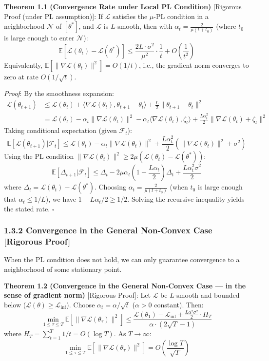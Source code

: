 \documentclass[
  12pt,
]{article}
\begin{document}
\textbf{Theorem 1.1 (Convergence Rate under Local PL Condition)} [Rigorous Proof (under PL assumption)]: If $\mathcal{L}$ satisfies the $\mu$-PL condition in a neighborhood $\mathcal{N}$ of $[\theta^*]$, and $\mathcal{L}$ is $L$-smooth, then with $\alpha_t = \frac{2}{\mu(t + t_0)}$ (where $t_0$ is large enough to enter $\mathcal{N}$):
\[\boxed{\mathbb{E}[\mathcal{L}(\theta_t) - \mathcal{L}(\theta^*)] \leq \frac{2L \cdot \sigma^2}{\mu^2} \cdot \frac{1}{t} + O\left(\frac{1}{t^2}\right)}\]
Equivalently, $\mathbb{E}[\|\nabla\mathcal{L}(\theta_t)\|^2] = O(1/t)$, i.e., the gradient norm converges to zero at rate $O(1/\sqrt{t})$.

\emph{Proof}: By the smoothness expansion:
\begin{align*}
\mathcal{L}(\theta_{t+1}) &\leq \mathcal{L}(\theta_t) + \langle\nabla\mathcal{L}(\theta_t), \theta_{t+1} - \theta_t\rangle + \frac{L}{2}\|\theta_{t+1} - \theta_t\|^2 \\
&= \mathcal{L}(\theta_t) - \alpha_t \|\nabla\mathcal{L}(\theta_t)\|^2 - \alpha_t \langle\nabla\mathcal{L}(\theta_t), \zeta_t\rangle + \frac{L\alpha_t^2}{2}\|\nabla\mathcal{L}(\theta_t) + \zeta_t\|^2
\end{align*}
Taking conditional expectation (given $\mathcal{F}_t$):
\[\mathbb{E}[\mathcal{L}(\theta_{t+1}) | \mathcal{F}_t] \leq \mathcal{L}(\theta_t) - \alpha_t \|\nabla\mathcal{L}(\theta_t)\|^2 + \frac{L\alpha_t^2}{2}(\|\nabla\mathcal{L}(\theta_t)\|^2 + \sigma^2)\]
Using the PL condition $\|\nabla\mathcal{L}(\theta_t)\|^2 \geq 2\mu(\mathcal{L}(\theta_t) - \mathcal{L}(\theta^*))$:
\[\mathbb{E}[\Delta_{t+1} | \mathcal{F}_t] \leq \Delta_t - 2\mu\alpha_t\left(1 - \frac{L\alpha_t}{2}\right)\Delta_t + \frac{L\alpha_t^2\sigma^2}{2}\]
where $\Delta_t = \mathcal{L}(\theta_t) - \mathcal{L}(\theta^*)$. Choosing $\alpha_t = \frac{2}{\mu(t+t_0)}$ (when $t_0$ is large enough that $\alpha_t \leq 1/L$), we have $1 - L\alpha_t/2 \geq 1/2$. Solving the recursive inequality yields the stated rate. $\square$

\subsubsection{1.3.2 Convergence in the General Non-Convex Case [Rigorous Proof]}\label{general-nonconvex-convergence}

When the PL condition does not hold, we can only guarantee convergence to a neighborhood of some stationary point.

\textbf{Theorem 1.2 (Convergence in the General Non-Convex Case --- in the sense of gradient norm)} [Rigorous Proof]: Let $\mathcal{L}$ be $L$-smooth and bounded below ($\mathcal{L}(\theta) \geq \mathcal{L}_{\inf}$). Choose $\alpha_t = \alpha / \sqrt{t}$ ($\alpha > 0$ constant). Then:
\[\boxed{\min_{1 \leq \tau \leq T} \mathbb{E}[\|\nabla\mathcal{L}(\theta_\tau)\|^2] \leq \frac{\mathcal{L}(\theta_1) - \mathcal{L}_{\inf} + \frac{L\alpha^2\sigma^2}{2} \cdot H_T}{\alpha \cdot (2\sqrt{T} - 1)}}\]
where $H_T = \sum_{t=1}^{T} 1/t = O(\log T)$. As $T \to \infty$:
\[\boxed{\min_{1 \leq \tau \leq T} \mathbb{E}[\|\nabla\mathcal{L}(\theta_\tau)\|^2] = O\left(\frac{\log T}{\sqrt{T}}\right)}\]
\end{document}
